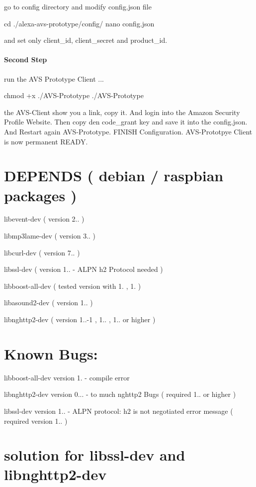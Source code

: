 go to config directory and modify config.\+json file 
\begin{DoxyCode}
cd ./alexa-avs-prototype/config/
nano config.json 
\end{DoxyCode}
 and set only client\+\_\+id, client\+\_\+secret and product\+\_\+id. \paragraph*{Second Step}

run the A\+VS Prototype Client ... 
\begin{DoxyCode}
chmod +x ./AVS-Prototype
./AVS-Prototype
\end{DoxyCode}
 the A\+V\+S-\/\+Client show you a link, copy it. And login into the Amazon Security Profile Website. Then copy den code\+\_\+grant key and save it into the config.\+json. And Restart again A\+V\+S-\/\+Prototype. F\+I\+N\+I\+SH Configuration. A\+V\+S-\/\+Prototpye Client is now permanent R\+E\+A\+DY. \section*{D\+E\+P\+E\+N\+DS ( debian / raspbian packages )}


\begin{DoxyItemize}
\item libevent-\/dev ( version 2.. )
\item libmp3lame-\/dev ( version 3.. )
\item libcurl-\/dev ( version 7.. )
\item libssl-\/dev ( version 1.. -\/ A\+L\+PN h2 Protocol needed )
\item libboost-\/all-\/dev ( tested version with 1. , 1. )
\item libasound2-\/dev ( version 1.. )
\item libnghttp2-\/dev ( version 1..-\/1 , 1.. , 1.. or higher ) \section*{Known Bugs\+:}
\end{DoxyItemize}


\begin{DoxyItemize}
\item libboost-\/all-\/dev version 1. -\/ compile error
\item libnghttp2-\/dev version 0... -\/ to much nghttp2 Bugs ( required 1.. or higher )
\item libssl-\/dev version 1.. -\/ A\+L\+PN protocol\+: h2 is not negotiated error message ( required version 1.. ) \section*{solution for libssl-\/dev and libnghttp2-\/dev}
\end{DoxyItemize}

